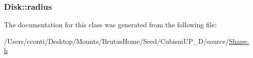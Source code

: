 \subsubsection[{radius}]{ Disk\+::radius\hspace{0.3cm}{\ttfamily [protected]}}\label{class_disk_ae6a9adac6c5dd96d63d0a3345f90499d}


The documentation for this class was generated from the following file\+:\begin{DoxyCompactItemize}
\item 
/\+Users/cconti/\+Desktop/\+Mounts/\+Brutus\+Home/\+Seed/\+Cubism\+U\+P\+\_\+D/source/\hyperlink{_shape_8h}{Shape.\+h}\end{DoxyCompactItemize}
